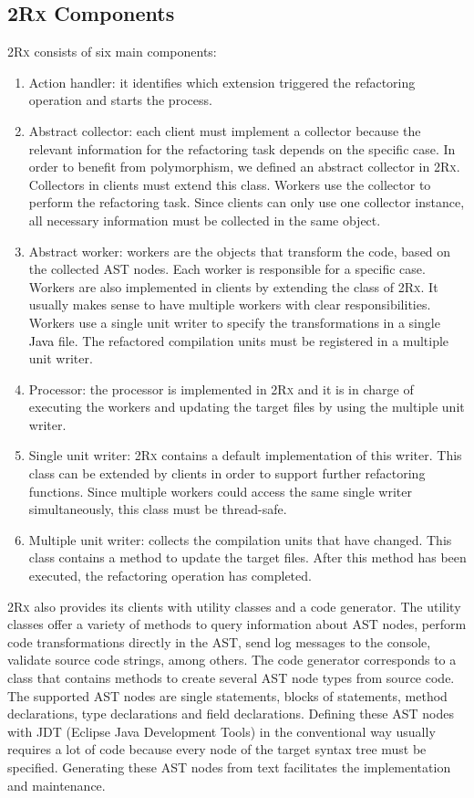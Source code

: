 \documentclass[type=bsc,accentcolor=tud9c]{tudthesis}
\newcommand{\framework}[1]{\textcolor{black}{#1}}
\newcommand{\toolcore}{\textsc{2Rx}}
\begin{document}
\subsection{\toolcore{} Components}
\label{sec:core-components}
\toolcore{} consists of six main components:
\begin{enumerate}
	\item Action handler: it identifies which extension triggered the refactoring operation and starts the process.
	\item Abstract collector: each client must implement a collector because the relevant information for the refactoring task depends on the specific case. In order to benefit from polymorphism, we defined an abstract collector in \toolcore{}. Collectors in clients must extend this class. Workers use the collector to perform the refactoring task. Since clients can only use one collector instance, all necessary information must be collected in the same object.
	\item Abstract worker: workers are the objects that transform the code, based on the collected AST nodes. Each worker is responsible for a specific case. Workers are also implemented in clients by extending the class  of \toolcore{}. It usually makes sense to have multiple workers with clear responsibilities. Workers use a single unit writer to specify the transformations in a single \framework{Java} file. The refactored compilation units must be registered in a multiple unit writer.
	\item Processor: the processor is implemented in \toolcore{} and it is in charge of executing the workers and updating the target files by using the multiple unit writer.
	\item Single unit writer: \toolcore{} contains a default implementation of this writer. This class can be extended by clients in order to support further refactoring functions. Since multiple workers could access the same single writer simultaneously, this class must be thread-safe.
	\item Multiple unit writer: collects the compilation units that have changed. This class contains a method to update the target files. After this method has been executed, the refactoring operation has completed.
\end{enumerate}

\toolcore{} also provides its clients with utility classes and a code generator. The utility classes offer a variety of methods to query information about AST nodes, perform code transformations directly in the AST, send log messages to the console, validate source code strings, among others. The code generator corresponds to a class that contains methods to create several AST node types from source code. The supported AST nodes are single statements, blocks of statements, method declarations, type declarations and field declarations. Defining these AST nodes with JDT (Eclipse Java Development Tools) in the conventional way usually requires a lot of code because every node of the target syntax tree must be specified. Generating these AST nodes from text facilitates the implementation and maintenance.
\end{document}
